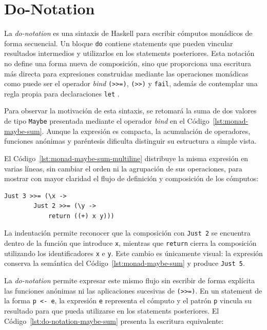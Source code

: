 
\section{Do-Notation}
\label{sec:do-notation}

La \textit{do-notation} es una sintaxis de \textsf{Haskell} para escribir cómputos monádicos de forma secuencial. Un bloque \texttt{do} contiene statements que pueden vincular resultados intermedios y utilizarlos en los statements posteriores. Esta notación no define una forma nueva de composición, sino que proporciona una escritura más directa para expresiones construidas mediante las operaciones monádicas como puede ser el operador \textit{bind} \verb|(>>=)|, \verb|(>>)| y \texttt{fail}, además de contemplar una regla propia para declaraciones \texttt{let} \cite[sección~3.14]{Haskell2010}.

Para observar la motivación de esta sintaxis, se retomará la suma de dos valores de tipo \texttt{Maybe} presentada mediante el operador \textit{bind} en el Código~\ref{lst:monad-maybe-sum}. Aunque la expresión es compacta, la acumulación de operadores, funciones anónimas y paréntesis dificulta distinguir su estructura a simple vista.

El Código~\ref{lst:monad-maybe-sum-multiline} distribuye la misma expresión en varias líneas, sin cambiar el orden ni la agrupación de sus operaciones, para mostrar con mayor claridad el flujo de definición y composición de los cómputos:

\begin{lstlisting}[style=haskell,caption={Forma multilínea de la suma monádica sobre \texttt{Maybe}.},label={lst:monad-maybe-sum-multiline}]
    Just 3 >>= (\x ->
        Just 2 >>= (\y ->
            return ((+) x y)))
\end{lstlisting}

La indentación permite reconocer que la composición con \texttt{Just 2} se encuentra dentro de la función que introduce \texttt{x}, mientras que \texttt{return} cierra la composición utilizando los identificadores \texttt{x} e \texttt{y}. Este cambio es únicamente visual: la expresión conserva la semántica del Código~\ref{lst:monad-maybe-sum} y produce \texttt{Just 5}.

La \textit{do-notation} permite expresar este mismo flujo sin escribir de forma explícita las funciones anónimas ni las aplicaciones sucesivas de \verb|(>>=)|. En un statement de la forma \verb|p <- e|, la expresión \texttt{e} representa el cómputo y el patrón \texttt{p} vincula su resultado para que pueda utilizarse en los statements posteriores. El Código~\ref{lst:do-notation-maybe-sum} presenta la escritura equivalente:

